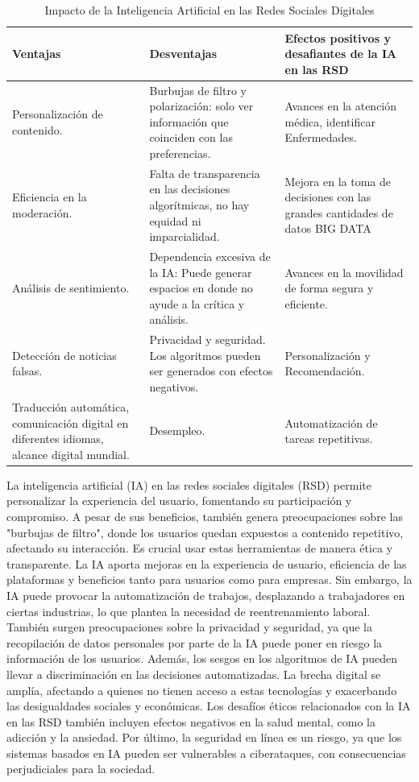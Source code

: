 \documentclass[runningheads]{llncs}
\begin{document}
\begin{table}[h!]
\centering
\begin{tabularx}{\textwidth}{|X|X|X|}
\hline
\textbf{Ventajas} & \textbf{Desventajas} & \textbf{Efectos positivos y desafiantes de la IA en las RSD} \\
\hline
Personalización de contenido. & Burbujas de filtro y polarización: solo ver información que coinciden con las preferencias. & Avances en la atención médica, identificar Enfermedades. \\
\hline
Eficiencia en la moderación. & Falta de transparencia en las decisiones algorítmicas, no hay equidad ni imparcialidad. & Mejora en la toma de decisiones con las grandes cantidades de datos BIG DATA \\
\hline
Análisis de sentimiento. & Dependencia excesiva de la IA: Puede generar espacios en donde no ayude a la crítica y análisis. & Avances en la movilidad de forma segura y eficiente. \\
\hline
Detección de noticias falsas. & Privacidad y seguridad. Los algoritmos pueden ser generados con efectos negativos. & Personalización y Recomendación. \\
\hline
Traducción automática, comunicación digital en diferentes idiomas, alcance digital mundial. & Desempleo. & Automatización de tareas repetitivas. \\
\hline
\end{tabularx}
\caption{Impacto de la Inteligencia Artificial en las Redes Sociales Digitales}
\label{tab:impacto_ia}
\end{table}
La inteligencia artificial (IA) en las redes sociales digitales (RSD) permite personalizar la experiencia del usuario, fomentando su participación y compromiso. A pesar de sus beneficios, también genera preocupaciones sobre las "burbujas de filtro", donde los usuarios quedan expuestos a contenido repetitivo, afectando su interacción. Es crucial usar estas herramientas de manera ética y transparente. La IA aporta mejoras en la experiencia de usuario, eficiencia de las plataformas y beneficios tanto para usuarios como para empresas.
Sin embargo, la IA puede provocar la automatización de trabajos, desplazando a trabajadores en ciertas industrias, lo que plantea la necesidad de reentrenamiento laboral. También surgen preocupaciones sobre la privacidad y seguridad, ya que la recopilación de datos personales por parte de la IA puede poner en riesgo la información de los usuarios.
Además, los sesgos en los algoritmos de IA pueden llevar a discriminación en las decisiones automatizadas. La brecha digital se amplía, afectando a quienes no tienen acceso a estas tecnologías y exacerbando las desigualdades sociales y económicas. Los desafíos éticos relacionados con la IA en las RSD también incluyen efectos negativos en la salud mental, como la adicción y la ansiedad. Por último, la seguridad en línea es un riesgo, ya que los sistemas basados en IA pueden ser vulnerables a ciberataques, con consecuencias perjudiciales para la sociedad.
% 
% 
\end{document}
